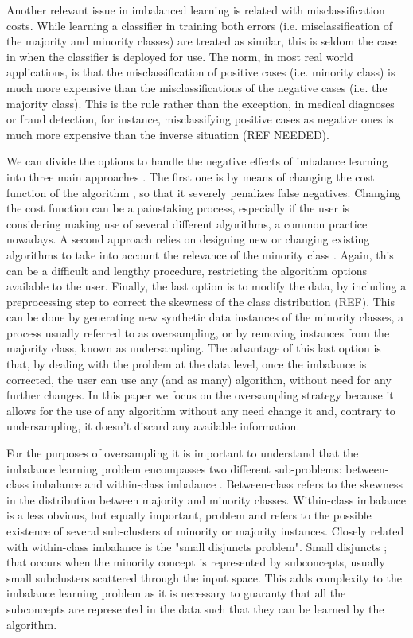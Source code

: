 \documentclass[parskip=full]{scrartcl}
\begin{document}
Another relevant issue in imbalanced learning is related with misclassification costs. While learning a classifier in training both errors (i.e. misclassification of the majority and minority classes) are treated as similar, this is seldom the case in when the classifier is  deployed for use. The norm, in most real world applications, is that the misclassification of positive cases (i.e. minority class) is much more expensive than the misclassifications of the negative cases (i.e. the majority class). This is the rule rather than the exception, in medical diagnoses or fraud detection, for instance, misclassifying positive cases as negative ones is much more expensive than the inverse situation (REF NEEDED).

We can divide the options to handle the negative effects of imbalance learning 
into three main approaches \cite{Fernandez2013}. The first one is by means of 
changing the cost function of the algorithm \cite{Wu2005}, so that it severely 
penalizes false negatives. Changing the cost function can be a painstaking 
process, especially if the user is considering making use of several different 
algorithms, a common practice nowadays. A second approach relies on designing 
new or changing existing algorithms to take into account the relevance of the 
minority class \cite{Chawla2008}. Again, this can be a difficult and 
lengthy procedure, restricting the algorithm options available to the user. 
Finally, the last option is to modify the data, by including a preprocessing 
step to correct the skewness of the class distribution (REF). This can be done 
by generating new synthetic data instances of the minority classes, a process 
usually referred to as oversampling, or by removing instances from the majority 
class, known as undersampling. The advantage of this last option is that, by 
dealing with the problem at the data level, once the imbalance is corrected, 
the user can use any (and as many) algorithm, without need for any further 
changes. In this paper we focus on the oversampling strategy because it allows 
for the use of any algorithm without any need change it and, contrary to 
undersampling, it doesn’t discard any available information.

For the purposes of oversampling it is important to understand that the 
imbalance learning problem encompasses two different sub-problems: 
between-class imbalance and within-class imbalance \cite{Jo2004}. Between-class 
refers to the skewness in the distribution between majority and minority 
classes. Within-class imbalance is a less obvious, but equally important, 
problem and refers to the possible existence of several sub-clusters of 
minority or majority instances. Closely related with within-class imbalance is 
the "small disjuncts problem". Small disjuncts \cite{Galar2012}; 
\cite{Weiss2003} that occurs when the minority concept is represented by 
subconcepts, usually small subclusters scattered through the input space. This 
adds complexity to the imbalance learning problem as it is necessary to 
guaranty that all the subconcepts are represented in the data such that they 
can be learned by the algorithm.
\end{document}
